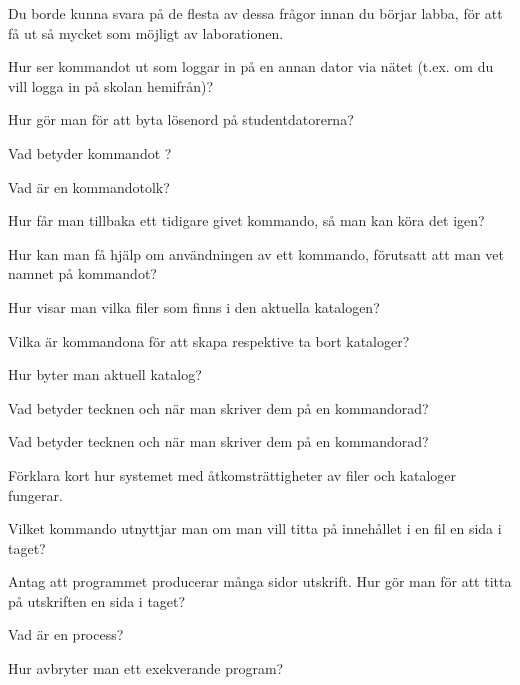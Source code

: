 Du borde kunna svara på de flesta av dessa frågor innan du börjar labba, för att få ut så mycket som möjligt av laborationen.
\begin{Kontrollfragor}
  \item Hur ser kommandot ut som loggar in på en annan dator via nätet (t.ex. om du vill logga in på skolan hemifrån)?
  \item Hur gör man för att byta lösenord på studentdatorerna?
  \item Vad betyder kommandot ?
  \item Vad är en kommandotolk?
  \item Hur får man tillbaka ett tidigare givet kommando, så man kan köra det igen?
  \item Hur kan man få hjälp om användningen av ett kommando, förutsatt att man vet namnet på kommandot?
  \item Hur visar man vilka filer som finns i den aktuella katalogen?
  \item Vilka är kommandona för att skapa respektive ta bort kataloger?
  \item Hur byter man aktuell katalog?
  \item Vad betyder tecknen  och \code{*} när man skriver dem på en kommandorad?
  \item Vad betyder tecknen \code{<} och \code{>} när man skriver dem på en kommandorad?
  \item Förklara kort hur systemet med åtkomsträttigheter av filer och kataloger fungerar.
  \item Vilket kommando utnyttjar man om man vill titta på innehållet i en fil en sida i taget?
  \item Antag att programmet  producerar många sidor utskrift. Hur gör man för att titta på utskriften en sida i taget?
  \item Vad är en process?
  \item Hur avbryter man ett exekverande program?

\end{Kontrollfragor} 

